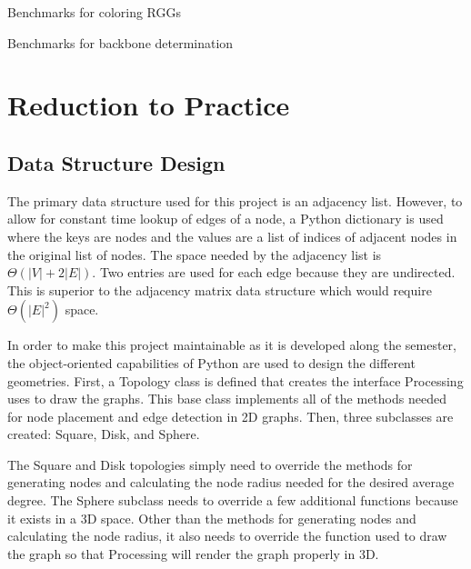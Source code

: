 \documentclass{article}
\begin{document}
    \begin{center}
        \begin{table}[h]
            \centering
            \caption{Benchmarks for coloring RGGs}
            \label{tab2}
        \end{table}
    \end{center}

    \begin{center}
        \begin{table}[h]
            \centering
            \begin{adjustbox}{width=1\textwidth}
            \end{adjustbox}
            \caption{Benchmarks for backbone determination}
            \label{tab3}
        \end{table}
    \end{center}

\section{Reduction to Practice}

    \subsection{Data Structure Design}
    The primary data structure used for this project is an adjacency list. However, to allow for constant time lookup of edges of a node, a Python dictionary is used where the keys are nodes and the values are a list of indices of adjacent nodes in the original list of nodes. The space needed by the adjacency list is $\Theta(|V| + 2|E|)$. Two entries are used for each edge because they are undirected. This is superior to the adjacency matrix data structure which would require $\Theta(|E|^2)$ space.
    \par
    In order to make this project maintainable as it is developed along the semester, the object-oriented capabilities of Python are used to design the different geometries. First, a Topology class is defined that creates the interface Processing uses to draw the graphs. This base class implements all of the methods needed for node placement and edge detection in 2D graphs. Then, three subclasses are created: Square, Disk, and Sphere.
    \par
    The Square and Disk topologies simply need to override the methods for generating nodes and calculating the node radius needed for the desired average degree. The Sphere subclass needs to override a few additional functions because it exists in a 3D space. Other than the methods for generating nodes and calculating the node radius, it also needs to override the function used to draw the graph so that Processing will render the graph properly in 3D.
\end{document}
